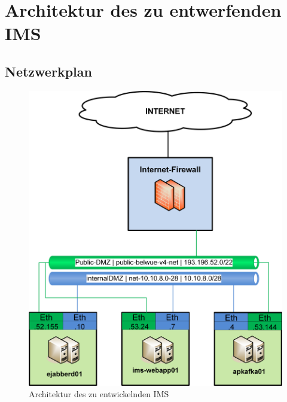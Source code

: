 \documentclass[a4paper,titlepage,halfparskip,12pt]{scrreprt}
\begin{document}

\newpage
\appendix
{}

\chapter{Architektur des zu entwerfenden \ac{IMS}}

\section{Netzwerkplan}

\begin{figure}[h]
	\centering
	\includegraphics[width=.95\linewidth]{images/Studienarbeit-Netzwerkplan}
	\caption{Architektur des zu entwickelnden \ac{IMS}}
	\label{img:ArchitekturIMS}
\end{figure}
\end{document}
